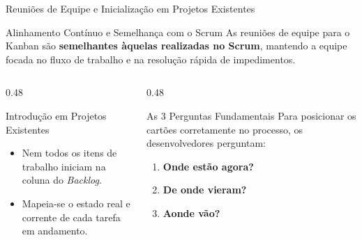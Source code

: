 \documentclass[aspectratio=169, 9pt]{beamer}
\begin{document}
\begin{frame}{Reuniões de Equipe e Inicialização em Projetos Existentes}
  \begin{block}{Alinhamento Contínuo e Semelhança com o Scrum}
    As reuniões de equipe para o Kanban são \textbf{semelhantes àquelas realizadas no Scrum}, mantendo a equipe focada no fluxo de trabalho e na resolução rápida de impedimentos.
  \end{block}

  \vspace{0.2cm}

  \begin{columns}[T]
    \begin{column}{0.48\textwidth}
      \begin{alertblock}{Introdução em Projetos Existentes}
        \begin{itemize}
          \item Nem todos os itens de trabalho iniciam na coluna do \textit{Backlog}.
          \item Mapeia-se o estado real e corrente de cada tarefa em andamento.
        \end{itemize}
      \end{alertblock}
    \end{column}

    \begin{column}{0.48\textwidth}
      \begin{exampleblock}{As 3 Perguntas Fundamentais}
        Para posicionar os cartões corretamente no processo, os desenvolvedores perguntam:
        \begin{enumerate}
          \item \textbf{Onde estão agora?}
          \item \textbf{De onde vieram?}
          \item \textbf{Aonde vão?}
        \end{enumerate}
      \end{exampleblock}
    \end{column}
  \end{columns}
\end{frame}
\end{document}
